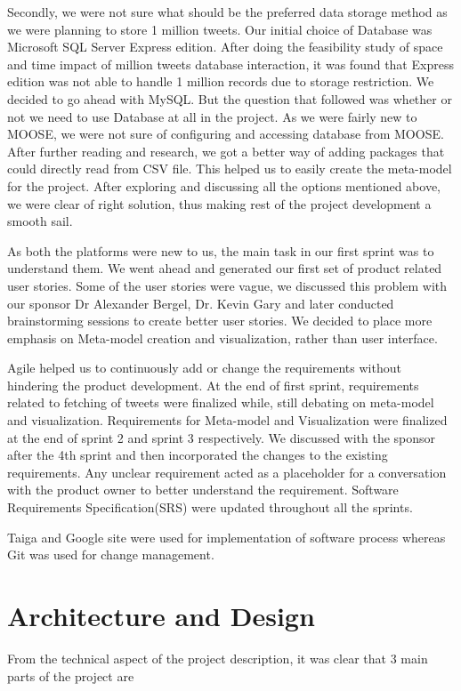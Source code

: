 \documentclass[11pt]{article}
\begin{document}
Secondly, we were not sure what should be the preferred data storage method as we were planning to store 1 million tweets. Our initial choice of Database was Microsoft SQL Server Express edition. After doing the feasibility study of space and time impact of million tweets database interaction, it was found that Express edition was not able to handle 1 million records due to storage restriction. We decided to go ahead with MySQL. But the question that followed was whether or not we need to use Database at all in the project. As we were fairly new to MOOSE, we were not sure of configuring and accessing database from MOOSE. After further reading and research, we got a better way of adding packages that could directly read from CSV file. This helped us to easily create the meta-model for the project. After exploring and discussing all the options mentioned above, we were clear of right solution, thus making rest of the project development a smooth sail.  

As both the platforms were new to us, the main task in our first sprint was to understand them. We went ahead and generated our first set of product related user stories. Some of the user stories were vague, we discussed this problem with our sponsor Dr Alexander Bergel, Dr. Kevin Gary and later conducted brainstorming sessions to create better user stories. We decided to place more emphasis on Meta-model creation and visualization, rather than user interface. 

Agile helped us to continuously add or change the requirements without hindering the product development. At the end of first sprint, requirements related to fetching of tweets were finalized while, still debating on meta-model and visualization. Requirements for Meta-model and Visualization were finalized at the end of sprint 2 and sprint 3 respectively. We discussed with the sponsor after the 4th sprint and then incorporated the changes to the existing requirements. Any unclear requirement acted as a placeholder for a conversation with the product owner to better understand the requirement. Software Requirements Specification(SRS) were updated throughout all the sprints.

Taiga and Google site were used for implementation of software process whereas Git was used for change management.


\section{Architecture and Design}
From the technical aspect of the project description, it was clear that 3 main parts of the project are
\end{document}
